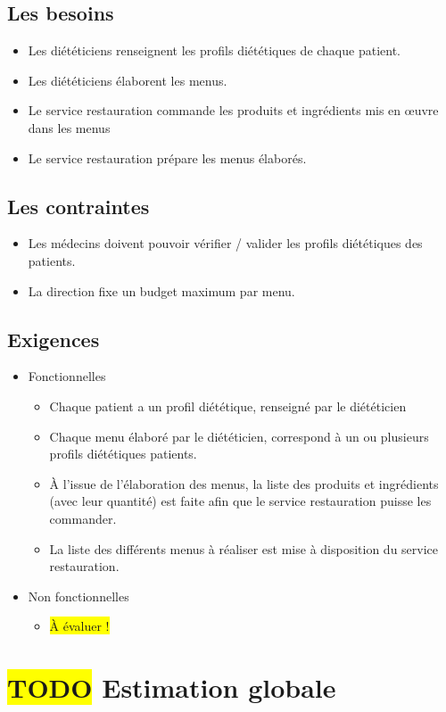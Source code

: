 \subsection{Les besoins}
\begin{itemize}
\item Les diététiciens renseignent les profils diététiques de chaque patient.
\item Les diététiciens élaborent les menus.
\item Le service restauration commande les produits et ingrédients mis en œuvre dans les menus
\item Le service restauration prépare les menus élaborés.
\end{itemize}

\subsection{Les contraintes}
\begin{itemize}
\item Les médecins doivent pouvoir vérifier / valider les profils diététiques des patients.
\item La direction fixe un budget maximum par menu.
\end{itemize}

\subsection{Exigences}
\begin{itemize}
\item Fonctionnelles
  \begin{itemize}
  \item Chaque patient a un profil diététique, renseigné par le diététicien
  \item Chaque menu élaboré par le diététicien, correspond à un ou plusieurs profils diététiques patients.
  \item À l'issue de l'élaboration des menus, la liste des produits et
    ingrédients (avec leur quantité) est faite afin que le service
    restauration puisse les commander.
  \item La liste des différents menus à réaliser est mise à disposition du service restauration.
  \end{itemize}
\item Non fonctionnelles
  \begin{itemize}
  \item \colorbox{yellow}{À évaluer !}
  \end{itemize}
\end{itemize}

\section{\colorbox{yellow}{TODO} Estimation globale}
